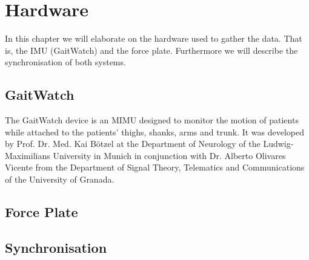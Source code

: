 \chapter{Hardware}
\label{ch:Hardware}

In this chapter we will elaborate on the hardware used to gather the data. That is, the IMU (GaitWatch) and the force plate. Furthermore we will describe the synchronisation of both systems.

\section{GaitWatch}

The GaitWatch device is an MIMU designed to monitor the motion of patients while attached to the patients’ thighs, shanks, arms and trunk. It was developed by Prof. Dr. Med. Kai Bötzel at the Department of Neurology of the Ludwig-Maximilians University in Munich in conjunction with Dr. Alberto Olivares Vicente from the Department of Signal Theory, Telematics and Communications of the University of Granada.


\section{Force Plate}


\section{Synchronisation}